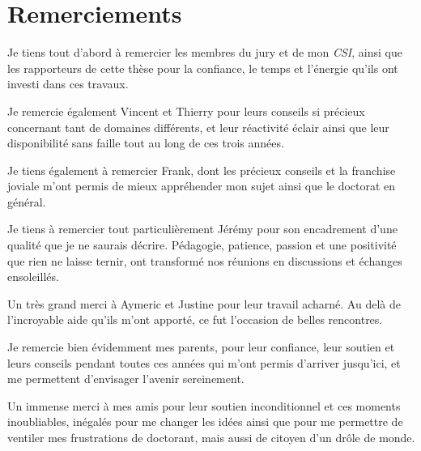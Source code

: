 \chapter*{Remerciements}
\newif\ifmerci
\mercitrue

\newcommand\merciSpace{0.1cm}

\ifmerci
Je tiens tout d'abord à remercier les membres du jury et de mon \textit{CSI}, ainsi que les rapporteurs de cette thèse pour la confiance, le temps et l'énergie qu'ils ont investi dans ces travaux.

\vspace{\merciSpace}

Je remercie également Vincent et Thierry pour leurs conseils si précieux concernant tant de domaines différents, et leur réactivité éclair ainsi que leur disponibilité sans faille tout au long de ces trois années.

\vspace{\merciSpace}

Je tiens également à remercier Frank, dont les précieux conseils et la franchise joviale m'ont permis de mieux appréhender mon sujet ainsi que le doctorat en général.

\vspace{\merciSpace}

Je tiens à remercier tout particulièrement Jérémy pour son encadrement d'une qualité que je ne saurais décrire. Pédagogie, patience, passion et une positivité que rien ne laisse ternir, ont transformé nos réunions en discussions et échanges ensoleillés.

\vspace{\merciSpace}

Un très grand merci à Aymeric et Justine pour leur travail acharné. Au delà de l'incroyable aide qu'ils m'ont apporté, ce fut l'occasion de belles rencontres.

\vspace{\merciSpace}

Je remercie bien évidemment mes parents, pour leur confiance, leur soutien et leurs conseils pendant toutes ces années qui m'ont permis d'arriver jusqu'ici, et me permettent d'envisager l'avenir sereinement.

\vspace{\merciSpace}

Un immense merci à mes amis pour leur soutien inconditionnel et ces moments inoubliables, inégalés pour me changer les idées ainsi que pour me permettre de ventiler mes frustrations de doctorant, mais aussi de citoyen d'un drôle de monde.

